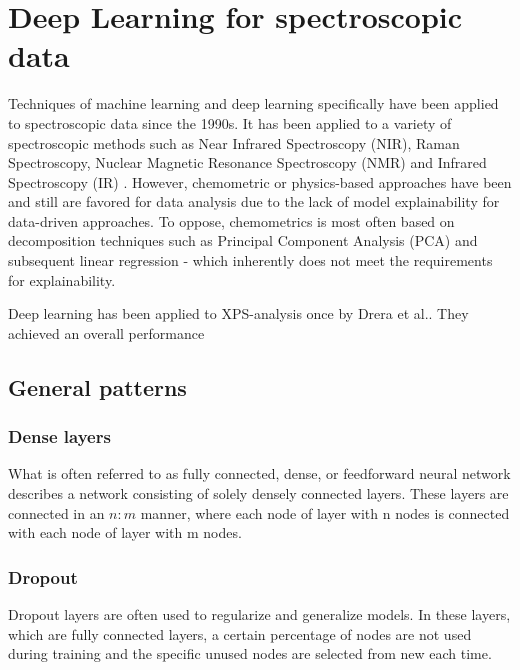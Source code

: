 \label{DL_theory}
\section{Deep Learning for spectroscopic data}

Techniques of machine learning and deep learning specifically have been applied to spectroscopic data since the 1990s. It has been applied to a variety of spectroscopic methods such as Near Infrared Spectroscopy (NIR), Raman Spectroscopy, Nuclear Magnetic Resonance Spectroscopy (NMR) and Infrared Spectroscopy (IR) . However, chemometric or physics-based approaches have been and still are favored for data analysis due to the lack of model explainability for data-driven approaches. To oppose, chemometrics is most often based on decomposition techniques such as Principal Component Analysis (PCA) and subsequent linear regression - which inherently does not meet the requirements for explainability.

Deep learning has been applied to XPS-analysis once by Drera et al.\cite{drera_deep_2019}. They achieved an overall performance 


\subsection{General patterns}

\subsubsection{Dense layers}
What is often referred to as fully connected, dense, or feedforward neural network describes a network consisting of solely densely connected layers. These layers are connected in an $n:m$ manner, where each node of layer with n nodes is connected with each node of layer with m nodes.


\subsubsection{Dropout}
Dropout layers are often used to regularize and generalize models. In these layers, which are fully connected layers, a certain percentage of nodes are not used during training and the specific unused nodes are selected from new each time.

\subsubsection{}

